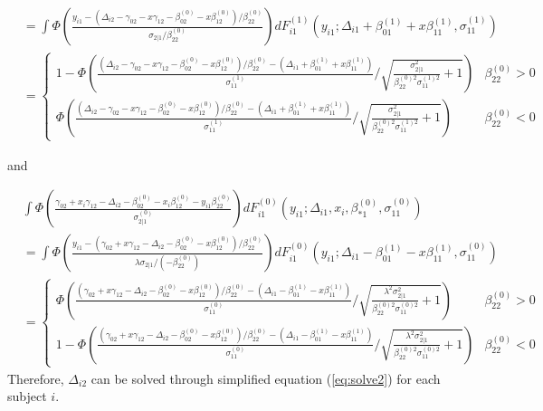 \documentclass[12pt]{article}
\begin{document}
\begin{itemize}
\begin{align*}
    &   = \int \Phi \left( \frac{y_{i1} - (\Delta_{i2} - \gamma_{02} - x \gamma_{12} - \beta_{02}^{(0)} - x\beta_{12}^{(0)})/\beta_{22}^{(0)}}{\sigma_{2|1}/\beta_{22}^{(0)}} \right) dF_{i1}^{(1)}(y_{i1}; \Delta_{i1}+\beta_{01}^{(1)} + x\beta_{11}^{(1)}, \sigma_{11}^{(1)}) \\
    & =
    \begin{cases}
      1 - \Phi \left( \frac{(\Delta_{i2} - \gamma_{02} - x \gamma_{12} - \beta_{02}^{(0)} - x\beta_{12}^{(0)})/\beta_{22}^{(0)} - (\Delta_{i1}+\beta_{01}^{(1)} + x\beta_{11}^{(1)}) }{\sigma_{11}^{(1)}} \big / \sqrt{\frac{\sigma_{2|1}^2}{\beta_{22}^{(0)2} \sigma_{11}^{(1)2}} +1} \right) & \beta_{22}^{(0)} > 0\\
      \Phi \left( \frac{(\Delta_{i2} - \gamma_{02} - x \gamma_{12} -
          \beta_{02}^{(0)} - x\beta_{12}^{(0)})/\beta_{22}^{(0)} -
          (\Delta_{i1}+\beta_{01}^{(1)} + x\beta_{11}^{(1)})
        }{\sigma_{11}^{(1)}} \big /
        \sqrt{\frac{\sigma_{2|1}^2}{\beta_{22}^{(0)2}
            \sigma_{11}^{(1)2}} +1} \right)& \beta_{22}^{(0)} < 0
    \end{cases}
  \end{align*}

  and

\begin{align*}
  &  \int \Phi \left( \frac{\gamma_{02} + x_i\gamma_{12} - \Delta_{i2} - \beta_{02}^{(0)} - x_i\beta_{12}^{(0)} - y_{i1}\beta_{22}^{(0)}}{\sigma_{2|1}^{(0)}} \right) dF_{i1}^{(0)}(y_{i1}; \Delta_{i1}, x_i, \beta_{*1}^{(0)}, \sigma_{11}^{(0)}) \\
  & = \int \Phi \left( \frac{y_{i1} - ( \gamma_{02} + x \gamma_{12} - \Delta_{i2} - \beta_{02}^{(0)} - x\beta_{12}^{(0)})/\beta_{22}^{(0)}}{\lambda\sigma_{2|1}/(-\beta_{22}^{(0)})} \right) dF_{i1}^{(0)}(y_{i1}; \Delta_{i1}-\beta_{01}^{(1)} - x\beta_{11}^{(1)}, \sigma_{11}^{(0)}) \\
  & =
  \begin{cases}
    \Phi \left( \frac{( \gamma_{02} + x \gamma_{12} - \Delta_{i2}  - \beta_{02}^{(0)} - x\beta_{12}^{(0)})/\beta_{22}^{(0)} - (\Delta_{i1} - \beta_{01}^{(1)} - x\beta_{11}^{(1)}) }{\sigma_{11}^{(0)}} \big / \sqrt{\frac{\lambda^{2}\sigma_{2|1}^2}{\beta_{22}^{(0)2} \sigma_{11}^{(0)2}} +1} \right) & \beta_{22}^{(0)} > 0\\
    1 - \Phi \left( \frac{( \gamma_{02} + x \gamma_{12} - \Delta_{i2}
        - \beta_{02}^{(0)} - x\beta_{12}^{(0)})/\beta_{22}^{(0)} -
        (\Delta_{i1} - \beta_{01}^{(1)} - x\beta_{11}^{(1)})
      }{\sigma_{11}^{(0)}} \big /
      \sqrt{\frac{\lambda^2\sigma_{2|1}^2}{\beta_{22}^{(0)2}
          \sigma_{11}^{(0)2}} +1} \right)& \beta_{22}^{(0)} < 0
  \end{cases}
\end{align*}
Therefore, $\Delta_{i2}$ can be solved through simplified equation
(\ref{eq:solve2}) for each subject $i$.
\end{itemize}
\end{document}
